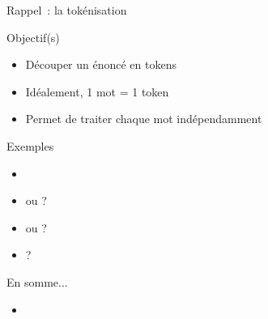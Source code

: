 \documentclass[serif, aspectratio=169]{beamer}
\begin{document}
\begin{frame}{Rappel~: la tokénisation}
    \begin{block}{Objectif(s)}
        \begin{itemize}
            \item Découper un énoncé en tokens
            \item Idéalement, 1 mot = 1 token
            \item Permet de traiter chaque mot indépendamment
        \end{itemize}
    \end{block}
    \begin{block}{Exemples}
        \begin{itemize}
            \item {}    
            \item {} ou    ?
            \item {} ou  \wordbox{-}  ?
            \item {}      ?
        \end{itemize}
    \end{block}
\end{frame}


\begin{frame}{En somme...}
    \begin{block}{}
        \begin{itemize}
            \item 
        \end{itemize}
    \end{block}
\end{frame}
\end{document}
